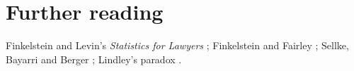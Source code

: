 \section*{Further reading}
Finkelstein and Levin's \emph{Statistics for Lawyers} \citep{finkelstein2015}; Finkelstein and Fairley \citep{finkelstein1970}; Sellke, Bayarri and Berger \citep{sellke2001}; Lindley's paradox \citep{lindley1957}.
